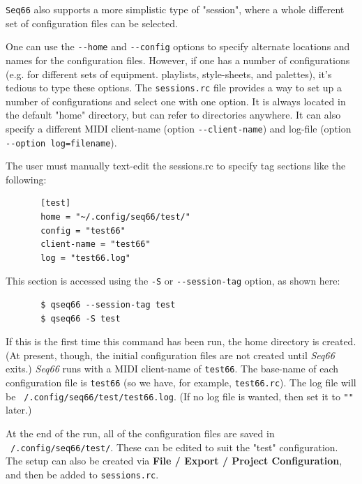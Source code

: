    \texttt{Seq66} also supports a more simplistic type of "session",
   where a whole different set of configuration files can be selected.

   One can use the \texttt{-{}-home} and \texttt{-{}-config} options
   to specify alternate locations and names for the configuration files.
   However, if one has a number of configurations
   (e.g. for different sets of equipment. playlists,
   style-sheets, and palettes),
   it's tedious to type these options.
   The \texttt{sessions.rc} file provides a way to set up a
   number of configurations and select one with one option.
   It is always located in the default
   "home" directory, but can refer to directories anywhere. It can also
   specify a different MIDI client-name
   (option \texttt{-{}-client-name})
   and log-file
   (option \texttt{-{}-option log=filename}).

   The user must manually text-edit the sessions.rc to specify tag
   sections like the following:

   \begin{verbatim}
       [test]
       home = "~/.config/seq66/test/"
       config = "test66"
       client-name = "test66"
       log = "test66.log"
   \end{verbatim}

   This section is accessed using the \texttt{-S} or
   \texttt{-{}-session-tag} option, as shown here:

   \begin{verbatim}
       $ qseq66 --session-tag test
       $ qseq66 -S test
   \end{verbatim}

   If this is the first time this command has been run, the
   home directory is created.
   (At present, though, the initial configuration files are not
   created until \textsl{Seq66} exits.)
   \textsl{Seq66} runs with a MIDI client-name of
   \texttt{test66}.
   The base-name of each configuration file
   is \texttt{test66} (so we have, for example, \texttt{test66.rc}).
   The log file will be
   \texttt{~/.config/seq66/test/test66.log}.
   (If no log file is wanted, then set it to \texttt{""} later.)

   At the end of the run, all of the configuration files are
   saved in 
   \texttt{~/.config/seq66/test/}.
   These can be edited to suit the "test" configuration.
   The setup can also be created via
   \textbf{File / Export / Project Configuration},
   and then be added to \texttt{sessions.rc}.

